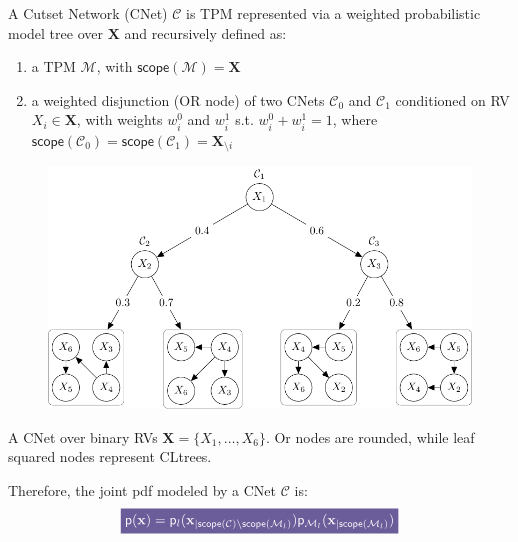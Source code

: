 \documentclass[final]{beamer}
\newcommand{\highlight}[2][yellow]{\mathchoice%
  {\colorbox{#1}{\strut\textcolor{white}{$\displaystyle{#2}$}}}%
  {\colorbox{#1}{\strut\textcolor{white}{$\textstyle{#2}$}}}%
  {\colorbox{#1}{\strut\textcolor{white}{$\scriptstyle{#2}$}}}%
  {\colorbox{#1}{\strut\textcolor{white}{$\scriptscriptstyle{#2}$}}}}%
\begin{document}
\begin{frame}{}
\begin{textblock}{17.5}
    A Cutset Network (CNet) $\mathcal{C}$ is TPM represented via a
    weighted probabilistic model tree over $\mathbf{X}$ and
    recursively defined as:
    \begin{enumerate}
    \item a TPM $\mathcal{M}$, with
      $\mathsf{scope}(\mathcal{M})=\mathbf X$
      \item a weighted  disjunction (OR node) of two CNets $\mathcal C_0$ and $\mathcal C_1$
     conditioned on RV $X_i \in \mathbf X$,  with
    weights $w_i^0$ and $w_i^1$ s.t. $w_i^0 + w_i^1 = 1$,
    where $\mathsf{scope}(\mathcal C_{0})=\mathsf{scope}(\mathcal C_{1})=\mathbf X_{\setminus i}$
    \end{enumerate}
    \begin{figure}
     \centering
     \includegraphics[width=15cm]{figures/csn}
  \label{fig:csn}
\end{figure}
\hspace{50pt}
\begin{minipage}{0.8\linewidth}
\scriptsize  A CNet over binary RVs
$\mathbf{X}=\{X_1,\dots,X_{6}\}$. Or nodes are rounded, while leaf squared nodes represent CLtrees.
\end{minipage}

\vspace{20pt}
Therefore, the joint pdf modeled by a CNet $\mathcal{C}$ is:
\begin{equation}
\highlight[lacamlilac]{\mathsf{p}(\mathbf{x}) = \mathsf{p}_l(\mathbf
x_{|\mathsf{scope}(\mathcal C)\setminus \mathsf{scope}(\mathcal
  M_l)})\mathsf{p}_{\mathcal M_l}(\mathbf x_{| \mathsf{scope}(\mathcal
  M_l)})}\label{eq:cnetdistr}
\end{equation}


  \end{textblock}


\end{frame}
\end{document}
